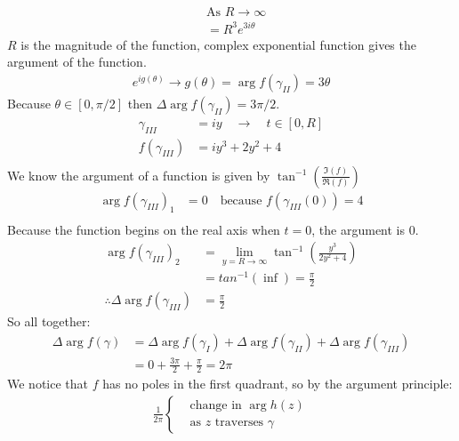 \begin{example}
\begin{align*}
                       & \text{As } R \to \infty                                                               \\
                       & = R^3e^{3i\theta}
    \end{align*}
    $R$ is the magnitude of the function, complex exponential function gives the argument of the function.
    \begin{align*}
        e^{ig(\theta)} \rightarrow g(\theta) = \arg f(\gamma_{II}) = 3\theta
    \end{align*}
    Because $\theta \in [0, \pi/2]$ then $\Delta \arg f(\gamma_{II}) = 3\pi/2$.
    \begin{align*}
        \gamma_{III}    & = iy \quad \rightarrow\quad t \in [0, R] \\
        f(\gamma_{III}) & = iy^3 + 2y^2 + 4                        \\
    \end{align*}
    We know the argument of a function is given by $\tan^{-1}(\frac{\Im(f)}{\Re(f)})$
    \begin{align*}
        \arg f(\gamma_{III})_1 & = 0 \quad \text{because } f(\gamma_{III}(0)) = 4 \\
    \end{align*}
    Because the function begins on the real axis when $t = 0$, the argument is $0$.
    \begin{align*}
        \arg f(\gamma_{III})_2                 & =\lim_{y= R\to \infty} \tan^{-1}\left(\frac{y^3}{2y^2 + 4}\right) \\
                                               & = tan^{-1}(\inf) = \frac{\pi}2                                    \\
        \therefore \Delta \arg f(\gamma_{III}) & = \frac{\pi}2
    \end{align*}
    So all together:
    \begin{align*}
        \Delta \arg f(\gamma) & = \Delta \arg f(\gamma_I) + \Delta \arg f(\gamma_{II}) + \Delta \arg f(\gamma_{III}) \\
                              & = 0 + \frac{3\pi}2 + \frac{\pi}2 = 2\pi
    \end{align*}
    We notice that $f$ has no poles in the first quadrant, so by the argument principle:
    \begin{align*}
        \frac{1}{2\pi}\left\{\begin{aligned}
                                  & \text{change in } \arg h(z)            \\
                                  & \text{as } z \text{ traverses } \gamma

\end{aligned}
\end{align*}
\end{example}
